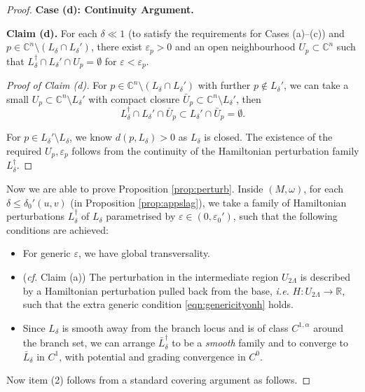 \documentclass[11pt,a4paper]{article}
\numberwithin{equation}{section}%
\theoremstyle{definition}
\newcommand{\ie}{\emph{i.e.} }
\newcommand{\cf}{\emph{cf.} }
\newcommand{\R}{\mathbb{R}}
\newcommand{\C}{\mathbb{C}}
\begin{document}
\begin{proof}
    
\textbf{Case (d): Continuity Argument.}
    
    \textbf{Claim (d).} For each $\delta\ll 1$ (to satisfy the requirements for Cases (a)--(c)) and $p\in \C^n\setminus (L_\delta\cap L_\delta')$, there exist $\varepsilon_p>0$ and an open neighbourhood $U_p\subset \C^n$ such that 
    $L_\delta^{\dagger}\cap L_\delta'\cap U_p=\emptyset$ for $\varepsilon<\varepsilon_p$. 
    \begin{proof}[Proof of Claim (d)] For $p\in \C^n\setminus (L_\delta\cap L_\delta')$ with further $p\notin L_\delta'$, we 
    can take a small $U_p\subset \C^n\setminus  L_\delta'$ with compact closure $\bar U_p\subset \C^n\setminus L_{\delta}'$, then
    $$L_\delta^{\dagger}\cap L_{\delta}'\cap \bar U_p\subset L_\delta'\cap \bar U_p=\emptyset.$$

   For $p\in L_\delta'\setminus L_\delta$, we know $d(p,L_\delta)>0$ as $L_\delta$ is closed. The existence of the required $U_p,\varepsilon_p$ follows from the  continuity of the Hamiltonian perturbation family $L_\delta^\dagger$. 
    \end{proof}
    Now we are able to prove Proposition \ref{prop:perturb}. Inside $(M,\omega)$, for each $\delta\leqslant \delta_0'(u,v)$ (in Proposition \ref{prop:appslag}), we take a family of Hamiltonian perturbations $L_\delta^{\dagger}$ of $L_\delta$ parametrised by $\varepsilon\in (0,\varepsilon_0')$, such that the following conditions are achieved:
    \begin{itemize}
        \item For generic $\varepsilon$, we have global transversality. 
        \item (\cf Claim (a)) The perturbation in the intermediate region $U_{2\Lambda}$ is described by a Hamiltonian perturbation pulled back from the base, \ie $H:U_{2\Lambda}\to \R$, such that the extra generic condition \eqref{eqn:genericityonh} holds. 
        \item Since $L_\delta$ is smooth away from the branch locus and is of class $C^{1,\alpha}$ around the branch set, we can arrange $\bar L_{\delta}^\dagger$ to be a \textit{smooth} family and to converge to $\bar L_\delta$ in $C^1$, with potential and grading convergence in $C^0$.   
    \end{itemize}
Now item (2) follows from a standard covering argument as follows. 


\end{proof}
\end{document}
